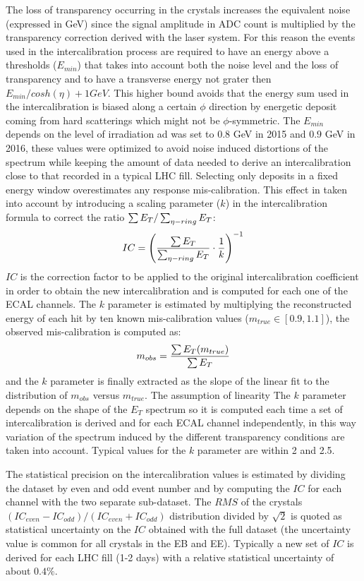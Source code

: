 The loss of transparency occurring in the crystals increases the equivalent noise (expressed in GeV) since the
signal amplitude in ADC count is multiplied by the transparency correction derived with the laser system.
For this reason the events used in the intercalibration process
are required to have an energy above a thresholds ($E_{min}$) that takes into
account both the noise level and the loss of transparency and to have a transverse energy not grater then
$E_{min}/cosh(\eta) + 1 GeV$. This higher bound avoids that the energy sum used in the intercalibration is
biased along a certain $\phi$ direction by energetic deposit coming from hard scatterings which might not be
$\phi$-symmetric. The $E_{min}$ depends on the level of irradiation ad was set to $0.8$ GeV in 2015 and $0.9$ GeV in 2016, these
values were optimized to avoid noise induced distortions of the spectrum while keeping the amount of data needed
to derive an intercalibration close to that recorded in a typical LHC fill.
Selecting only deposits in a fixed energy window overestimates any response mis-calibration. This effect in taken into
account by introducing a scaling parameter ($k$) in the intercalibration formula to correct the ratio $\sum E_T/\sum_{\eta-ring} E_T$:
\[
  IC = \left( \frac{\sum E_T}{\sum_{\eta-ring} E_T}  \cdot \frac{1}{k} \right)^{-1}
\]
$IC$ is the correction factor to be applied to the original intercalibration coefficient in order to obtain the
new intercalibration and is computed for each one of the ECAL channels.
The $k$ parameter is estimated by multiplying the reconstructed energy of each hit by ten known
mis-calibration values ($m_{true} \in [0.9, 1.1]$), the observed mis-calibration is computed as:
\[
  m_{obs} = \frac{\sum E_T(m_{true})}{\sum E_T}
\]
and the $k$ parameter is finally extracted as the slope of the linear fit to the distribution of $m_{obs}$ versus $m_{true}$.
The assumption of linearity 
The $k$ parameter depends on the shape of the $E_T$ spectrum so it is computed each time a set of intercalibration
is derived and for each ECAL channel independently, in this way variation of the spectrum induced by the different transparency
conditions are taken into account. Typical values for the $k$ parameter are within 2 and 2.5.

The statistical precision on the intercalibration values is estimated by dividing the dataset by even and odd event number
and by computing the $IC$ for each channel with the two separate sub-dataset.
The $RMS$ of the crystals $(IC_{even}-IC_{odd})/(IC_{even}+IC_{odd})$ distribution divided by $\sqrt{2}$ is quoted as statistical
uncertainty on the $IC$ obtained with the full dataset (the uncertainty value is common for all crystals in the EB and EE).
Typically a new set of $IC$ is derived for each LHC fill (1-2 days) with a relative statistical uncertainty of about $0.4\%$.

